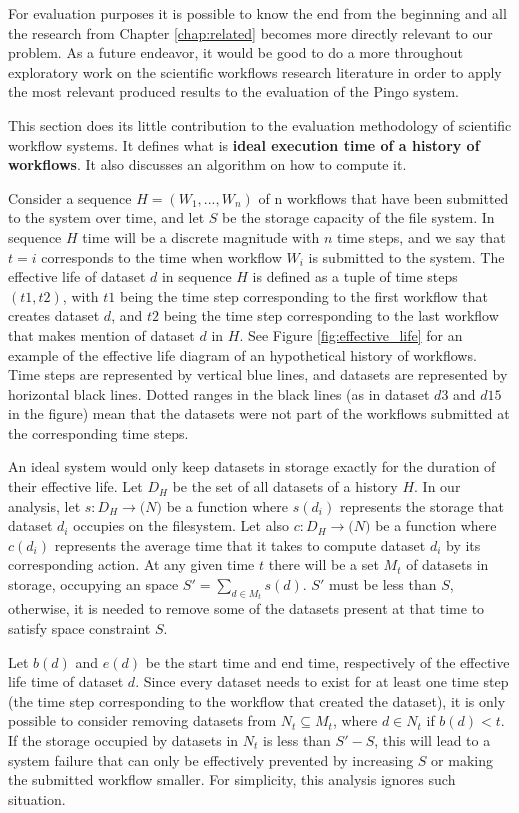 For evaluation purposes it is possible to know the end from the beginning and all the research from Chapter \ref{chap:related} becomes more directly relevant to our problem.  As a future endeavor, it would be good to do a more throughout exploratory work on the scientific workflows research literature in order to apply the most relevant produced results to the evaluation of the Pingo system.

This section does its little contribution to the evaluation methodology of scientific workflow systems.  It defines what is \textbf{ideal execution time of a history of workflows}.  It also discusses an algorithm on how to compute it.  

Consider a sequence $H=(W_1, ..., W_n)$ of n workflows that have been submitted to the system over time, and let $S$ be the storage capacity of the file system.  In sequence $H$ time will be a discrete magnitude with $n$ time steps, and we say that $t = i$ corresponds to the time when workflow $W_i$ is submitted to the system. The effective life of dataset $d$ in sequence $H$ is defined as a tuple of time steps $(t1, t2)$, with $t1$ being the time step corresponding to the first workflow that creates dataset $d$, and  $t2$ being the time step corresponding to the last workflow that makes mention of dataset $d$ in $H$.  See Figure \ref{fig:effective_life} for an example of the effective life diagram of an hypothetical history of workflows.  Time steps are represented by vertical blue lines, and datasets are represented by horizontal black lines.  Dotted ranges in the black lines (as in dataset $d3$ and $d15$ in the figure) mean that the datasets were not part of the workflows submitted at the corresponding time steps.

An ideal system would only keep datasets in storage exactly for the duration of their effective life.  Let $D_H$ be the set of all datasets of a history $H$.  In our analysis, let $s: D_H \to \mathtt(N)$ be a function where $s(d_i)$ represents the storage that dataset $d_i$ occupies on the filesystem.  Let also $c: D_H \to \mathtt(N)$ be a function where $c(d_i)$ represents the average time that it takes to compute dataset $d_i$ by its corresponding action. At any given time $t$ there will be a set $M_t$ of datasets in storage, occupying an space $S' = \sum_{d \in M_t}{s(d)}$.  $S'$ must be less than $S$, otherwise, it is needed to remove some of the datasets present at that time to satisfy space constraint $S$.

Let $b(d)$ and $e(d)$ be the start time and end time, respectively of the effective life time of dataset $d$.  Since every dataset needs to exist for at least one time step (the time step corresponding to the workflow that created the dataset), it is only possible to consider removing datasets from $N_t \subseteq M_t$, where $d \in N_t$ if $b(d) < t$.  If the storage occupied by datasets in $N_t$ is less than $S' - S$, this will lead to a system failure that can only be effectively prevented by increasing $S$ or making the submitted workflow smaller.  For simplicity, this analysis ignores such situation.


